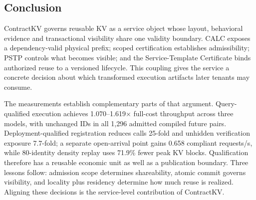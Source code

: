 \begin{samepage}
\section{Conclusion}
\label{sec:conclusion}
ContractKV governs reusable KV as a service object whose layout, behavioral evidence and transactional visibility share one validity boundary. CALC exposes a dependency-valid physical prefix; scoped certification establishes admissibility; PSTP controls what becomes visible; and the Service-Template Certificate binds authorized reuse to a versioned lifecycle. This coupling gives the service a concrete decision about which transformed execution artifacts later tenants may consume.

The measurements establish complementary parts of that argument. Query-qualified execution achieves 1.070--1.619$\times$ full-cost throughput across three models, with unchanged IDs in all 1,296 admitted compiled future pairs. Deployment-qualified registration reduces calls 25-fold and unhidden verification exposure 7.7-fold; a separate open-arrival point gains 0.658 compliant requests/s, while 80-identity density replay uses 71.9\% fewer peak KV blocks. Qualification therefore has a reusable economic unit as well as a publication boundary. Three lessons follow: admission scope determines shareability, atomic commit governs visibility, and locality plus residency determine how much reuse is realized. Aligning these decisions is the service-level contribution of ContractKV.
\end{samepage}
